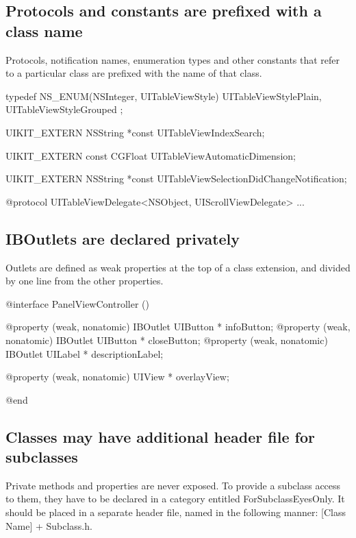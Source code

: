 \documentclass[10pt]{extarticle}
\newenvironment{codelisting}
{\footnotesize\mdframed[middlelinewidth=0.5pt, middlelinecolor=BaliHaiColor, skipabove=15pt]\verbatim}
{\endverbatim\endmdframed\vspace{12pt}\normalsize}
\begin{document}
\subsection{Protocols and constants are prefixed with a class name}

Protocols, notification names, enumeration types and other constants that refer to a particular class are prefixed with the name of that class.

\begin{codelisting}
typedef NS_ENUM(NSInteger, UITableViewStyle) {
    UITableViewStylePlain,
    UITableViewStyleGrouped
};

UIKIT_EXTERN NSString *const UITableViewIndexSearch;

UIKIT_EXTERN const CGFloat UITableViewAutomaticDimension;

UIKIT_EXTERN NSString *const UITableViewSelectionDidChangeNotification;

@protocol UITableViewDelegate<NSObject, UIScrollViewDelegate>
...
\end{codelisting}

\subsection{IBOutlets are declared privately}

Outlets are defined as weak properties at the top of a class extension, and divided by one line from the other properties.

\begin{codelisting}
@interface PanelViewController ()

@property (weak, nonatomic) IBOutlet UIButton * infoButton;
@property (weak, nonatomic) IBOutlet UIButton * closeButton;
@property (weak, nonatomic) IBOutlet UILabel * descriptionLabel;

@property (weak, nonatomic) UIView * overlayView;

@end
\end{codelisting}


\subsection{Classes may have additional header file for subclasses}

Private methods and properties are never exposed. To provide a subclass access to them, they have to be declared in a category entitled ForSubclassEyesOnly. It should be placed in a separate header file, named in the following manner: [Class Name] + Subclass.h. 
\end{document}
